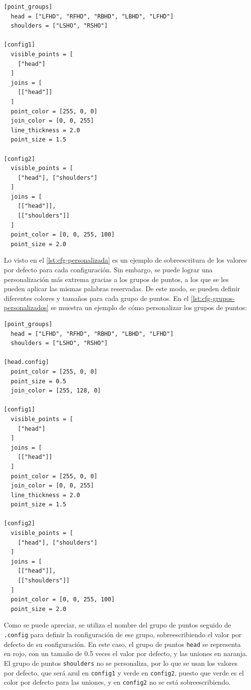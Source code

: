 \begin{lstlisting}[style=mystyle, caption={Configuración personalizada}, label={lst:cfg-personalizada}]
[point_groups]
  head = ["LFHD", "RFHD", "RBHD", "LBHD", "LFHD"]
  shoulders = ["LSHO", "RSHO"]

[config1]
  visible_points = [
    ["head"]
  ]
  joins = [
    [["head"]]
  ]
  point_color = [255, 0, 0]
  join_color = [0, 0, 255]
  line_thickness = 2.0
  point_size = 1.5

[config2]
  visible_points = [
    ["head"], ["shoulders"]
  ]
  joins = [
    [["head"]], 
    [["shoulders"]]
  ]
  point_color = [0, 0, 255, 100]
  point_size = 2.0
\end{lstlisting}

Lo visto en el \autoref{lst:cfg-personalizada} es un ejemplo de sobreescritura de los valores por defecto para cada configuración. Sin embargo, se puede lograr una personalización más extrema gracias a los grupos de puntos, a los que se les pueden aplicar las mismas palabras reservadas. De este modo, se pueden definir diferentes colores y tamaños para cada grupo de puntos. En el \autoref{lst:cfg-grupos-personalizados} se muestra un ejemplo de cómo personalizar los grupos de puntos:

\begin{lstlisting}[style=mystyle, caption={Configuración personalizada de grupos de puntos}, label={lst:cfg-grupos-personalizados}]
[point_groups]
  head = ["LFHD", "RFHD", "RBHD", "LBHD", "LFHD"]
  shoulders = ["LSHO", "RSHO"]

[head.config]
  point_color = [255, 0, 0]
  point_size = 0.5
  join_color = [255, 128, 0]

[config1]
  visible_points = [
    ["head"]
  ]
  joins = [
    [["head"]]
  ]
  point_color = [255, 0, 0]
  join_color = [0, 0, 255]
  line_thickness = 2.0
  point_size = 1.5

[config2]
  visible_points = [
    ["head"], ["shoulders"]
  ]
  joins = [
    [["head"]], 
    [["shoulders"]]
  ]
  point_color = [0, 0, 255, 100]
  point_size = 2.0
\end{lstlisting}

Como se puede apreciar, se utiliza el nombre del grupo de puntos seguido de \texttt{.config} para definir la configuración de ese grupo, sobreescribiendo el valor por defecto de su configuración. En este caso, el grupo de puntos \texttt{head} se representa en rojo, con un tamaño de 0.5 veces el valor por defecto, y las uniones en naranja. El grupo de puntos \texttt{shoulders} no se personaliza, por lo que se usan los valores por defecto, que será azul en \texttt{config1} y verde en \texttt{config2}, puesto que verde es el color por defecto para las uniones, y en \texttt{config2} no se está sobreescribiendo.

